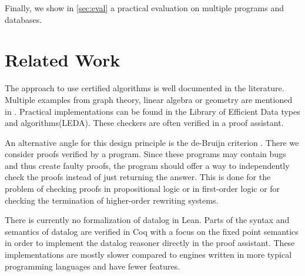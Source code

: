 Finally, we show in \cref{sec:eval} a practical evaluation on multiple programs and databases.

\section{Related Work}

The approach to use certified algorithms is well documented in the literature. Multiple examples from graph theory, linear algebra or geometry are mentioned in \cite{CertAlg}. Practical implementations can be found in the Library of Efficient Data types and algorithms(LEDA)\cite{Leda}. These checkers are often verified in a proof assistant\cite{CertCheckerWorkflow}.

An alternative angle for this design principle is the de-Bruijn criterion \cite{deBruijnCriterion}. There we consider proofs verified by a program. Since these programs may contain bugs and thus create faulty proofs, the program should offer a  way to independently check the proofs instead of just returning the answer. This is done for the problem of checking proofs in propositional logic\cite{deBruijnPropProof} or in first-order logic\cite{deBruijnFOProof} or for checking the termination of higher-order rewriting systems\cite{deBruijnRewriting}.

There is currently no formalization of datalog in Lean. Parts of the syntax and semantics of datalog are verified in Coq\cite{datalogCoq} with a focus on the fixed point semantics in order to implement the datalog reasoner directly in the proof assistant\cite{datalogCoq, regularDatalogCoq}. These implementations are mostly slower compared to engines written in more typical programming languages and have fewer features.